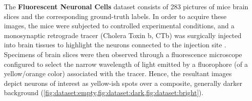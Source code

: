 

The \textbf{Fluorescent Neuronal Cells} dataset \cite{clissa2021fluocells} consists of 283 
pictures 
of mice brain slices and the corresponding ground-truth labels.
In order to acquire these images, the mice were subjected to controlled experimental conditions, and a monosynaptic retrograde tracer (Cholera Toxin b, CTb) was surgically injected into brain tissues to highlight the neurons connected to the injection site
\cite{hitrec2019neural}.
Specimens of brain slices were then observed through  
a fluorescence microscope configured to select the narrow wavelength of light emitted by a fluorophore (of a yellow/orange color) associated with the tracer.
Hence, the resultant images depict neurons of interest as
yellow-ish spots
over a composite, generally darker background
(\cref{fig:dataset:empty,fig:dataset:dark,fig:dataset:bright}).

